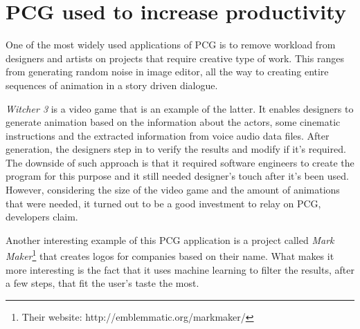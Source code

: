 \documentclass[journal]{IEEEtran}
\begin{document}
\section{PCG used to increase productivity}
One of the most widely used applications of PCG is to remove workload from designers and artists on projects that require creative type of work. This ranges from generating random noise in image editor, all the way to creating entire sequences of animation in a story driven dialogue.
\par
\textit{Witcher 3} is a video game that is an example of the latter. It enables designers to generate animation based on the information about the actors, some cinematic instructions and the extracted information from voice audio data files. After generation, the designers step in to verify the results and modify if it's required. The downside of such approach is that it required software engineers to create the program for this purpose and it still needed designer's touch after it's been used. However, considering the size of the video game and the amount of animations that were needed, it turned out to be a good investment to relay on PCG, developers claim.
\par
Another interesting example of this PCG application is a project called \textit{Mark Maker}\footnote{Their website: http://emblemmatic.org/markmaker/} that creates logos for companies based on their name. What makes it more interesting is the fact that it uses machine learning to filter the results, after a few steps, that fit the user's taste the most.
\end{document}
